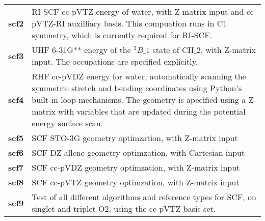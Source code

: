 \begin{tabular*}{\textwidth}[tb]{p{}p{}}
{\bf scf2} &  RI-SCF cc-pVTZ energy of water, with Z-matrix input and cc-pVTZ-RI auxilliary basis. This compuation runs in C1 symmetry, which is currently required for RI-SCF.\\
{\bf scf3} &  UHF 6-31G** energy of the $^3B\_1$ state of CH$\_2$, with Z-matrix input. The occupations are specified explicitly.\\
{\bf scf4} &  RHF cc-pVDZ energy for water, automatically scanning the symmetric stretch and bending coordinates using Python's built-in loop mechanisms.  The geometry is apecified using a Z-matrix with variables that are updated during the potential energy surface scan.\\
{\bf scf5} &  SCF STO-3G geometry optimzation, with Z-matrix input\\
{\bf scf6} &  SCF DZ allene geometry optimzation, with Cartesian input\\
{\bf scf7} &  SCF cc-pVDZ geometry optimzation, with Z-matrix input\\
{\bf scf8} &  SCF cc-pVTZ geometry optimzation, with Z-matrix input\\
{\bf scf9} &  Test of all different algorithms and reference types for SCF, on singlet and triplet O2, using the cc-pVTZ basis set.\\
\end{tabular*}